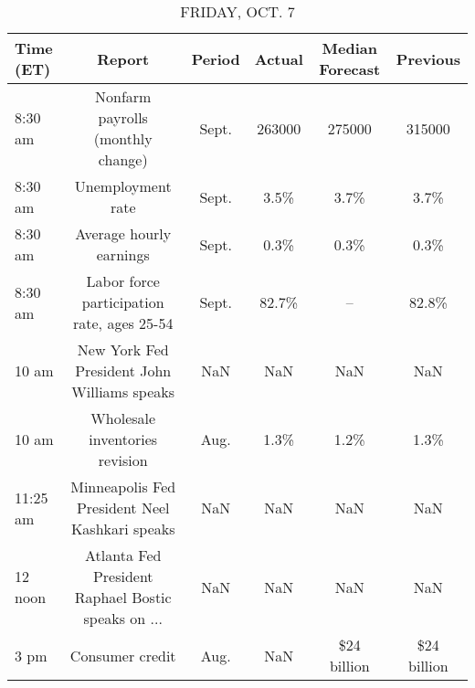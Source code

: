 \documentclass{article}%
\begin{document}
\begin{table}[htbp]%
\caption{FRIDAY, OCT. 7}%
\centering%
\begin{adjustbox}{width=1\textwidth}%
\begin{tabular}{lccccc}
\toprule
Time (ET) &                                             Report & Period & Actual & Median Forecast &    Previous \\
\midrule
  8:30 am &                  Nonfarm payrolls (monthly change) &  Sept. & 263000 &          275000 &      315000 \\
  8:30 am &                                  Unemployment rate &  Sept. &   3.5\% &            3.7\% &        3.7\% \\
  8:30 am &                            Average hourly earnings &  Sept. &   0.3\% &            0.3\% &        0.3\% \\
  8:30 am &         Labor force participation rate, ages 25-54 &  Sept. &  82.7\% &              -- &       82.8\% \\
    10 am &        New York Fed President John Williams speaks &    NaN &    NaN &             NaN &         NaN \\
    10 am &                     Wholesale inventories revision &   Aug. &   1.3\% &            1.2\% &        1.3\% \\
 11:25 am &     Minneapolis Fed President Neel Kashkari speaks &    NaN &    NaN &             NaN &         NaN \\
  12 noon & Atlanta Fed President Raphael Bostic speaks on ... &    NaN &    NaN &             NaN &         NaN \\
     3 pm &                                    Consumer credit &   Aug. &    NaN &     \$24 billion & \$24 billion \\
\bottomrule
\end{tabular}
%
\end{adjustbox}%
\end{table}
\end{document}
